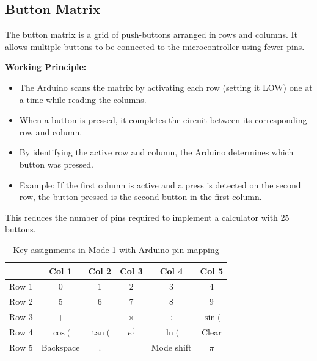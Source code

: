\documentclass[conference]{IEEEtran}
\begin{document}
\subsection{Button Matrix}
The button matrix is a grid of push-buttons arranged in rows and columns. It allows multiple buttons to be connected to the microcontroller using fewer pins.

\textbf{Working Principle:}
\begin{itemize}
    \item The Arduino scans the matrix by activating each row (setting it LOW) one at a time while reading the columns.
    \item When a button is pressed, it completes the circuit between its corresponding row and column.
    \item By identifying the active row and column, the Arduino determines which button was pressed.
    \item Example: If the first column is active and a press is detected on the second row, the button pressed is the second button in the first column.
\end{itemize}
This reduces the number of pins required to implement a calculator with 25 buttons.
\begin{table}[h!]\centering
\caption{Key assignments in Mode 1 with Arduino pin mapping}
\renewcommand{\arraystretch}{1.3}
\begin{tabular}{c|c|c|c|c|c}
\toprule
      & Col 1 & Col 2 & Col 3 & Col 4 & Col 5 \\
\midrule
Row 1 & 0 & 1 & 2 & 3 & 4 \\
Row 2 & 5 & 6 & 7 & 8 & 9 \\
Row 3 & + & - & $\times$ & $\div$ & $\sin($ \\
Row 4 & $\cos($ & $\tan($ & $e^{(}$ & $\ln($ & Clear \\
Row 5 & Backspace & . & = & Mode shift& $\pi$ \\
\bottomrule
\end{tabular}
\end{table}
\end{document}
